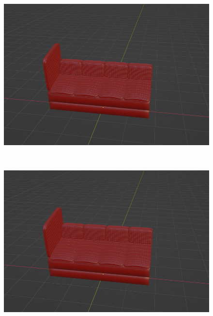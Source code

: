 \begin{figure}[h]
\begin{minipage}[b]{0.48\linewidth}
 \end{minipage}
 \begin{minipage}[b]{0.48\linewidth}
  \centering
  \includegraphics[scale=0.17]{./imgs/sofaParamMean/backTickMax.png}
 \end{minipage}\\
  \begin{minipage}[b]{0.48\linewidth}
  \centering
  \includegraphics[scale=0.17]{./imgs/sofaParamMean/backSideHeightMin.png}
 \end{minipage}
 \begin{minipage}[b]{0.48\linewidth}
  \centering

\end{minipage}
\end{figure}
